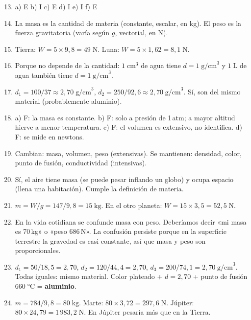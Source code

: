 \documentclass[12pt, a4paper]{article}
\begin{document}
\begin{enumerate}[leftmargin=*, label=\textbf{\arabic*.}]
  \setcounter{enumi}{12}
  \item a) E \quad b) I \quad c) E \quad d) I \quad e) I \quad f) E

  \item La masa es la cantidad de materia (constante, escalar, en kg). El peso es la fuerza gravitatoria (varía según $g$, vectorial, en N).

  \item Tierra: $W = 5 \times 9{,}8 = 49\;\text{N}$. Luna: $W = 5 \times 1{,}62 = 8{,}1\;\text{N}$.

  \item Porque no depende de la cantidad: $1\;\text{cm}^3$ de agua tiene $d = 1\;\text{g/cm}^3$ y $1\;\text{L}$ de agua también tiene $d = 1\;\text{g/cm}^3$.

  \item $d_1 = 100/37 \approx 2{,}70\;\text{g/cm}^3$, $d_2 = 250/92{,}6 \approx 2{,}70\;\text{g/cm}^3$. Sí, son del mismo material (probablemente aluminio).

  \item a) F: la masa es constante. b) F: solo a presión de 1\,atm; a mayor altitud hierve a menor temperatura. c) F: el volumen es extensivo, no identifica. d) F: se mide en newtons.

  \item Cambian: masa, volumen, peso (extensivas). Se mantienen: densidad, color, punto de fusión, conductividad (intensivas).

  \item Sí, el aire tiene masa (se puede pesar inflando un globo) y ocupa espacio (llena una habitación). Cumple la definición de materia.

  \item $m = W/g = 147/9{,}8 = 15\;\text{kg}$. En el otro planeta: $W = 15 \times 3{,}5 = 52{,}5\;\text{N}$.

  \item En la vida cotidiana se confunde masa con peso. Deberíamos decir «mi masa es 70\,kg» o «peso 686\,N». La confusión persiste porque en la superficie terrestre la gravedad es casi constante, así que masa y peso son proporcionales.

  \item $d_1 = 50/18{,}5 = 2{,}70$, $d_2 = 120/44{,}4 = 2{,}70$, $d_3 = 200/74{,}1 = 2{,}70\;\text{g/cm}^3$. Todas iguales: mismo material. Color plateado + $d = 2{,}70$ + punto de fusión $660\;°$C = \textbf{aluminio}.

  \item $m = 784/9{,}8 = 80\;\text{kg}$. Marte: $80 \times 3{,}72 = 297{,}6\;\text{N}$. Júpiter: $80 \times 24{,}79 = 1\,983{,}2\;\text{N}$. En Júpiter pesaría más que en la Tierra.
\end{enumerate}
\end{document}

